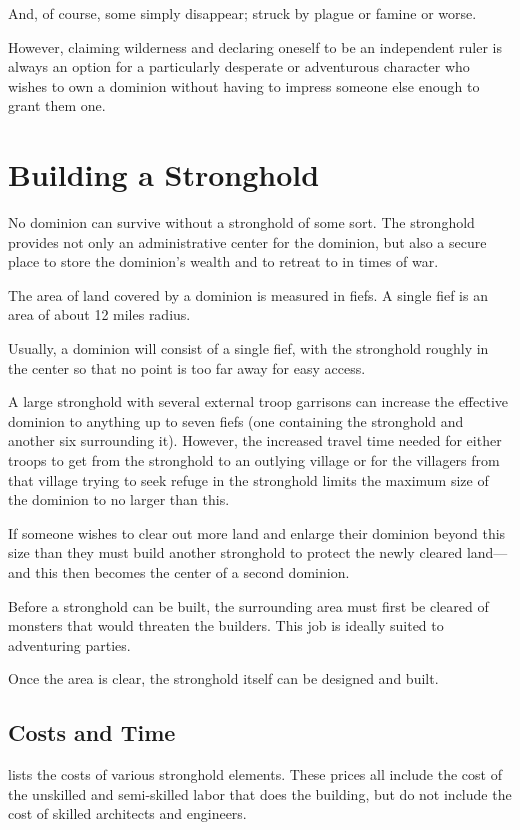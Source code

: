 \begin{multicols*}{2}
And, of course, some simply disappear; struck by plague or famine or worse.

However, claiming wilderness and declaring oneself to be an independent ruler is always an option for a particularly desperate or adventurous character who wishes to own a dominion without having to impress someone else enough to grant them one.

\section{Building a Stronghold}
No dominion can survive without a stronghold of some sort. The stronghold provides not only an administrative center for the dominion, but also a secure place to store the dominion’s wealth and to retreat to in times of war.

The area of land covered by a dominion is measured in fiefs. A single fief is an area of about 12 miles radius.

Usually, a dominion will consist of a single fief, with the stronghold roughly in the center so that no point is too far away for easy access.

A large stronghold with several external troop garrisons can increase the effective dominion to anything up to seven fiefs (one containing the stronghold and another six surrounding it). However, the increased travel time needed for either troops to get from the stronghold to an outlying village or for the villagers from that village trying to seek refuge in the stronghold limits the maximum size of the dominion to no larger than this.

If someone wishes to clear out more land and enlarge their dominion beyond this size than they must build another stronghold to protect the newly cleared land—and this then becomes the center of a second dominion.

Before a stronghold can be built, the surrounding area must first be cleared of monsters that would threaten the builders. This job is ideally suited to adventuring parties.

Once the area is clear, the stronghold itself can be designed and built.

\subsection{Costs and Time}
 lists the costs of various stronghold elements. These prices all include the cost of the unskilled and semi-skilled labor that does the building, but do not include the cost of skilled architects and engineers.


\end{multicols*}

